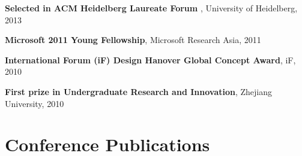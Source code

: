 \documentclass[margin,line]{res}
\begin{document}
\begin{resume}
\textbf{Selected in ACM Heidelberg Laureate Forum }, University of Heidelberg, 2013


\textbf{Microsoft 2011 Young Fellowship}, Microsoft Research Asia, 2011


\textbf{International Forum (iF) Design Hanover Global Concept Award}, iF, 2010 

\textbf{First prize in Undergraduate Research and Innovation}, Zhejiang University, 2010   





%
%
%     
%
%
%	
%	
%
%


\section{\sc Conference Publications}


\end{resume}
\end{document}
